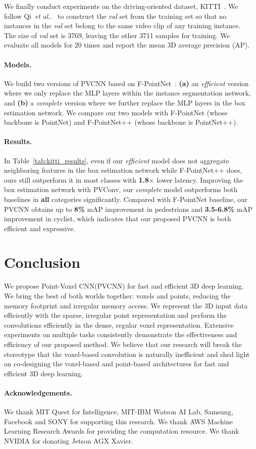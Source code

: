 \documentclass{article}
\makeatletter
\newcommand{\tab}[1]{Table~\ref{#1}}
\DeclareRobustCommand\onedot{\futurelet\@let@token\@onedot}
\def\@onedot{\ifx\@let@token.\else.\null\fi\xspace}
\def\etal{\emph{et al}\onedot}
\newcommand{\myparagraph}[1]{\vspace{-6pt}\paragraph{#1}}
\def\model{Point-Voxel CNN\xspace}
\def\modelshort{PVCNN\xspace}
\def\convshort{PVConv\xspace}
\makeatother
\begin{document}
We finally conduct experiments on the driving-oriented dataset, KITTI~\cite{Geiger:2013kt}. We follow Qi~\etal~\cite{Qi:2018fd} to construct the \emph{val} set from the training set so that no instances in the \emph{val} set belong to the same video clip of any training instance. The size of \emph{val} set is 3769, leaving the other 3711 samples for training. We evaluate all models for 20 times and report the mean 3D average precision (AP).

\myparagraph{Models.}

We build two versions of \modelshort based on F-PointNet~\cite{Qi:2018fd}: \textbf{(a)} an \emph{efficient} version where we only replace the MLP layers within the instance segmentation network, and \textbf{(b)} a \emph{complete} version where we further replace the MLP layers in the box estimation network. We compare our two models with F-PointNet (whose backbone is PointNet) and F-PointNet++ (whose backbone is PointNet++).

\myparagraph{Results.}

In \tab{tab:kitti_results}, even if our \emph{efficient} model does not aggregate neighboring features in the box estimation network while F-PointNet++ does, ours still outperform it in most classes with \textbf{1.8$\times$} lower latency. Improving the box estimation network with \convshort, our \emph{complete} model outperforms both baselines in \textbf{all} categories significantly. Compared with F-PointNet baseline, our \modelshort obtains up to \textbf{8\%} mAP improvement in pedestrians and \textbf{3.5-6.8\%} mAP improvement in cyclist, which indicates that our proposed \modelshort is both efficient and expressive. \section{Conclusion}

We propose \model (\modelshort) for fast and efficient 3D deep learning. We bring the best of both worlds together: voxels and points, reducing the memory footprint and irregular memory access. We represent the 3D input data efficiently with the sparse, irregular point representation and perform the convolutions efficiently in the dense, regular voxel representation. Extensive experiments on multiple tasks consistently demonstrate the effectiveness and efficiency of our proposed method. We believe that our research will break the stereotype that the voxel-based convolution is naturally inefficient and shed light on co-designing the voxel-based and point-based architectures for fast and efficient 3D deep learning. \myparagraph{Acknowledgements.}

We thank MIT Quest for Intelligence, MIT-IBM Watson AI Lab, Samsung, Facebook and SONY for supporting this research. We thank AWS Machine Learning Research Awards for providing the computation resource. We thank NVIDIA for donating Jetson AGX Xavier. 
{\small


}
\end{document}
